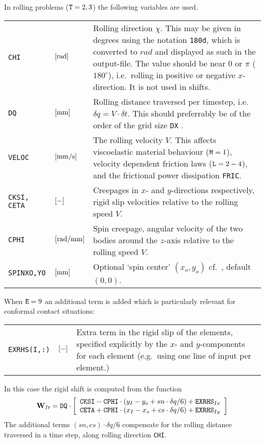 \documentclass[12pt]{report}
\newenvironment{inputvars}{\vspace{0.4\baselineskip}%

\begin{tabular}{>{\raggedright}p{22mm}p{19mm}p{113mm}}}{
\end{tabular}

}
\newcommand{\inpvar}[3]{{\small\tt #1} & $#2$ & #3 \\[1ex]}
\newcommand{\inpbreak}{\end{inputvars}\begin{inputvars}}
\begin{document}
In rolling problems (${\tt T}=2,3$) the following variables are used.
\begin{inputvars}
\inpvar{CHI}{\bunit{rad}}{Rolling direction $\chi$. This may be given in
        degrees using the notation {\tt 180d}, which is converted to
        $\unit{rad}$ and displayed as such in the output-file. The value
        should be near $0$ or $\pi$ ($180^\circ$), i.e.\ rolling in
        positive or negative $x$-direction. It is not used in shifts.}
\inpvar{DQ}{\bunit{mm}}{Rolling distance traversed per timestep, i.e.\
        $\delta q=V\cdot\delta t$. This should preferrably be of the
        order of the grid size {\tt DX} \cite{Wekken2017a-wiggles}.}
\inpvar{VELOC}{\bunit{mm/s}}{The rolling velocity $V$. This affects
        viscoelastic material behaviour (${\tt M}=1$), velocity dependent
        friction laws (${\tt L}=2-4$), and the frictional power dissipation
        {\tt FRIC}.}
\inpvar{CKSI, CETA}{\bunit{-}}{Creepages in $x$- and $y$-directions
        respectively, rigid slip velocities relative to the rolling speed
        $V$.}
\inpvar{CPHI}{\bunit{rad/mm}}{Spin creepage, angular velocity of the two
        bodies around the $z$-axis relative to the rolling speed $V$.}
\inpvar{SPINXO,YO}{\bunit{mm}}{Optional `spin center' $(x_o,y_o)$ cf.\
        \cite{Vollebregt2018a-sdec}, default $(0,0)$.}
\end{inputvars}
When ${\tt E}=9$ an additional term is added which is particularly relevant
for conformal contact situations:
\begin{inputvars}
\inpvar{EXRHS(I,:)}{\bunit{-}}{Extra term in the rigid slip of the elements,
        specified explicitly by the $x$- and $y$-components for each
        element (e.g.\ using one line of input per element.)}
\end{inputvars}
In this case the rigid shift is computed from the function
\begin{equation}\label{eq:rig_shift_roll}
 \vec{W}_{It} = {\tt DQ} \cdot \left[
        \begin{array}{l}
        {\tt CKSI} - {\tt CPHI} \cdot (y_I-y_o+sn\cdot\delta q/6)
                + {\tt EXRHS}_{Ix}  \\
        {\tt CETA} + {\tt CPHI} \cdot (x_I-x_o+cs\cdot\delta q/6)
                + {\tt EXRHS}_{Iy}
        \end{array} \right]
\end{equation}
The additional terms $(sn,cs)\cdot\delta q/6$ compensate for the rolling
distance traversed in a time step, along rolling direction {\tt CHI}.
\end{document}
